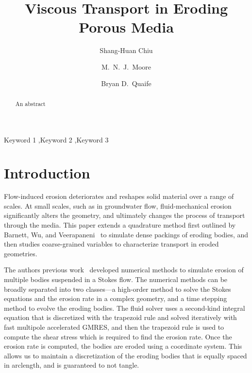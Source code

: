 \documentclass[preprint, 10pt]{elsarticle}
\begin{document}
\title{Viscous Transport in Eroding Porous Media}



\author[SH]{Shang-Huan Chiu}
\author[Nick]{M.~N.~J.~Moore}
\author[Bryan]{Bryan D.~Quaife}

\address[SH]{Department of Scientific Computing, Florida State
University, Tallahassee, FL, 32306.}
\address[Nick]{Department of Mathematics and Geophysical Fluid Dynamics Institute, Florida State University, Tallahassee, FL, 32306.}
\address[Bryan]{Department of Scientific Computing and Geophysical Fluid Dynamics Institute, Florida State University, Tallahassee, FL, 32306.}

\begin{abstract} 
  An abstract
\end{abstract}

\begin{keyword}
  Keyword 1 \sep Keyword 2 \sep Keyword 3 
\end{keyword}

\maketitle

\section{Introduction}
\label{s:intro}
Flow-induced erosion deteriorates and reshapes solid material over a
range of scales.  At small scales, such as in groundwater flow,
fluid-mechanical erosion significantly alters the geometry, and
ultimately changes the process of transport through the media.  This
paper extends a quadrature method first outlined by Barnett, Wu, and
Veerapaneni~\cite{bar-wu-vee2015} to simulate dense packings of eroding
bodies, and then studies coarse-grained variables to characterize
transport in eroded geometries.

The authors previous work~\cite{qua-moo2018} developed numerical methods
to simulate erosion of multiple bodies suspended in a Stokes flow.  The
numerical methods can be broadly separated into two classes---a
high-order method to solve the Stokes equations and the erosion rate in
a complex geometry, and a time stepping method to evolve the eroding
bodies.  The fluid solver uses a second-kind integral equation that is
discretized with the trapezoid rule and solved iteratively with fast
multipole accelerated GMRES, and then the trapezoid rule is used to
compute the shear stress which is required to find the erosion rate.
Once the erosion rate is computed, the bodies are eroded using a {\thL}
coordinate system.  This allows us to maintain a discretization of the
eroding bodies that is equally spaced in arclength, and is guaranteed to
not tangle.
\end{document}

